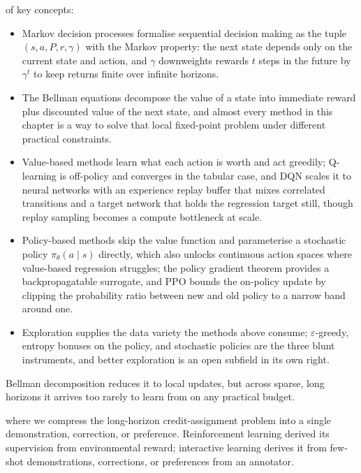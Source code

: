 \vspace{1.5em}

 of key concepts:

\begin{itemize}
    \item Markov decision processes formalise sequential decision making as the tuple $(s, a, P, r, \gamma)$ with the Markov property: the next state depends only on the current state and action, and $\gamma$ downweights rewards $t$ steps in the future by $\gamma^t$ to keep returns finite over infinite horizons.
    \item The Bellman equations decompose the value of a state into immediate reward plus discounted value of the next state, and almost every method in this chapter is a way to solve that local fixed-point problem under different practical constraints.
    \item Value-based methods learn what each action is worth and act greedily; Q-learning is off-policy and converges in the tabular case, and DQN scales it to neural networks with an experience replay buffer that mixes correlated transitions and a target network that holds the regression target still, though replay sampling becomes a compute bottleneck at scale.
    \item Policy-based methods skip the value function and parameterise a stochastic policy $\pi_\theta(a \mid s)$ directly, which also unlocks continuous action spaces where value-based regression struggles; the policy gradient theorem provides a backpropagatable surrogate, and PPO bounds the on-policy update by clipping the probability ratio between new and old policy to a narrow band around one.
    \item Exploration supplies the data variety the methods above consume; $\varepsilon$-greedy, entropy bonuses on the policy, and stochastic policies are the three blunt instruments, and better exploration is an open subfield in its own right.
\end{itemize}

\vspace{2.5em}


Bellman decomposition reduces it to local updates,
but across sparse, long horizons it arrives too rarely to learn from on any practical budget.

where we compress the long-horizon credit-assignment problem into a single demonstration,
correction, or preference.
Reinforcement learning derived its supervision from environmental reward;
interactive learning derives it from few-shot demonstrations, corrections, or preferences from an annotator.

